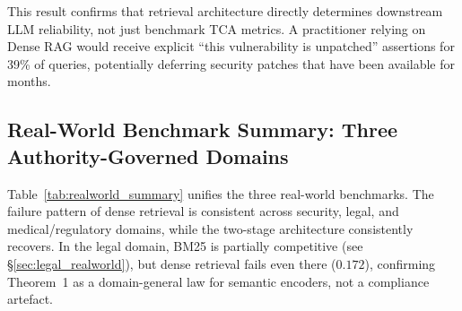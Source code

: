 \documentclass[11pt]{article}
\begin{document}
\begin{table}[h]
\centering
\small
{}
\caption{GPT-4o-mini answer quality on 159 GHSA pairs. All gold answers are \emph{patched}. ``Says Patched'' = LLM asserts the vulnerability is fixed; ``Conf.\ Wrong'' = LLM explicitly asserts it is \emph{not} patched. Dense retrieval causes confident wrong assertions for 39\% of queries. Two-stage retrieval cuts this to 16.4\% ($-22.6$~pp). Artifact: \texttt{data/llm\_downstream\_results.json}.}
\label{tab:llm_downstream}
\end{table}

This result confirms that retrieval architecture directly determines downstream LLM reliability, not just benchmark TCA metrics. A practitioner relying on Dense RAG would receive explicit ``this vulnerability is unpatched'' assertions for 39\% of queries, potentially deferring security patches that have been available for months.

\subsection{Real-World Benchmark Summary: Three Authority-Governed Domains}
\label{sec:realworld_summary}

Table~\ref{tab:realworld_summary} unifies the three real-world benchmarks. The failure pattern of dense retrieval is consistent across security, legal, and medical/regulatory domains, while the two-stage architecture consistently recovers. In the legal domain, BM25 is partially competitive (see \S\ref{sec:legal_realworld}), but dense retrieval fails even there ($0.172$), confirming Theorem~1 as a domain-general law for semantic encoders, not a compliance artefact.
\end{document}
